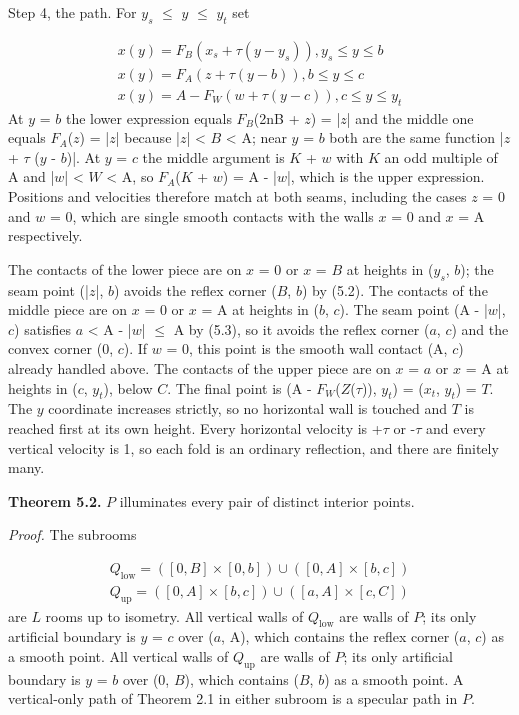 \documentclass[11pt]{article}
\begin{document}
Step 4, the path. For \(y_{s}\) \(\le\) \(y\) \(\le\) \(y_{t}\) set

\begin{gather*}
x(y) = F_{B}(x_{s} + \tau (y - y_{s})),              y_{s} \le  y \le  b \\
x(y) = F_{A}(z + \tau (y - b)),                  b \le  y \le  c \\
x(y) = A - F_{W}(w + \tau (y - c)),              c \le  y \le  y_{t}
\end{gather*}
At \(y\) = \(b\) the lower expression equals \(F_{B}\)(2nB + \(z\)) = |\(z\)| and the middle one equals \(F_{A}\)(\(z\)) = |\(z\)| because |\(z\)| < \(B\) < A; near \(y\) = \(b\) both are the same function |\(z\) + \(\tau\) (\(y\) - \(b\))|. At \(y\) = \(c\) the middle argument is \(K\) + \(w\) with \(K\) an odd multiple of A and |\(w\)| < \(W\) < A, so \(F_{A}\)(\(K\) + \(w\)) = A - |\(w\)|, which is the upper expression. Positions and velocities therefore match at both seams, including the cases \(z\) = 0 and \(w\) = 0, which are single smooth contacts with the walls \(x\) = 0 and \(x\) = A respectively.

The contacts of the lower piece are on \(x\) = 0 or \(x\) = \(B\) at heights in (\(y_{s}\), \(b\)); the seam point (|\(z\)|, \(b\)) avoids the reflex corner (\(B\), \(b\)) by (5.2). The contacts of the middle piece are on \(x\) = 0 or \(x\) = A at heights in (\(b\), \(c\)). The seam point (A - |\(w\)|, \(c\)) satisfies \(a\) < A - |\(w\)| \(\le\) A by (5.3), so it avoids the reflex corner (\(a\), \(c\)) and the convex corner (0, \(c\)). If \(w\) = 0, this point is the smooth wall contact (A, \(c\)) already handled above. The contacts of the upper piece are on \(x\) = \(a\) or \(x\) = A at heights in (\(c\), \(y_{t}\)), below \(C\). The final point is (A - \(F_{W}\)(\(Z\)(\(\tau\))), \(y_{t}\)) = (\(x_{t}\), \(y_{t}\)) = \(T\). The \(y\) coordinate increases strictly, so no horizontal wall is touched and \(T\) is reached first at its own height. Every horizontal velocity is +\(\tau\) or -\(\tau\) and every vertical velocity is 1, so each fold is an ordinary reflection, and there are finitely many.

\textbf{Theorem 5.2.} \(P\) illuminates every pair of distinct interior points.

\emph{Proof.} The subrooms

\begin{gather*}
Q_{\mathrm{low}} = ([0,B] \times [0,b]) \cup ([0,A] \times [b,c]) \\
Q_{\mathrm{up}}  = ([0,A] \times [b,c]) \cup ([a,A] \times [c,C])
\end{gather*}
are \(L\) rooms up to isometry. All vertical walls of \(Q_{\mathrm{low}}\) are walls of \(P\); its only artificial boundary is \(y\) = \(c\) over (\(a\), A), which contains the reflex corner (\(a\), \(c\)) as a smooth point. All vertical walls of \(Q_{\mathrm{up}}\) are walls of \(P\); its only artificial boundary is \(y\) = \(b\) over (0, \(B\)), which contains (\(B\), \(b\)) as a smooth point. A vertical-only path of Theorem 2.1 in either subroom is a specular path in \(P\).
\end{document}
